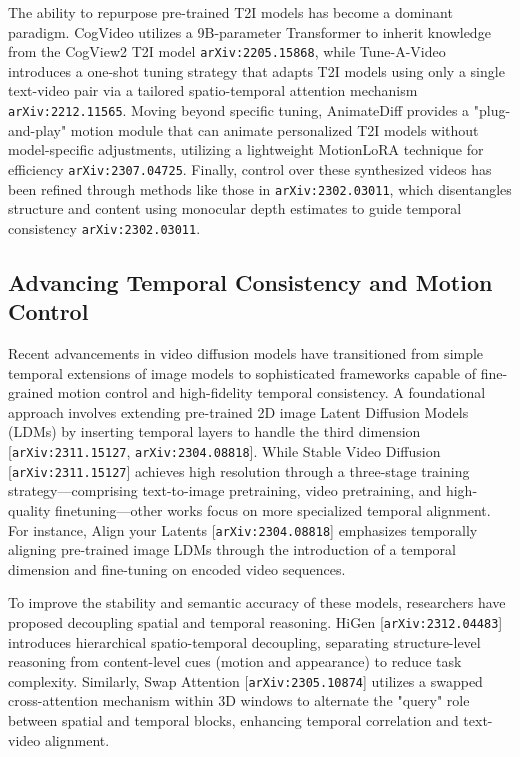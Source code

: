 \documentclass[11pt]{article}
\begin{document}
The ability to repurpose pre-trained T2I models has become a dominant paradigm. CogVideo utilizes a 9B-parameter Transformer to inherit knowledge from the CogView2 T2I model \texttt{arXiv:2205.15868}, while Tune-A-Video introduces a one-shot tuning strategy that adapts T2I models using only a single text-video pair via a tailored spatio-temporal attention mechanism \texttt{arXiv:2212.11565}. Moving beyond specific tuning, AnimateDiff provides a "plug-and-play" motion module that can animate personalized T2I models without model-specific adjustments, utilizing a lightweight MotionLoRA technique for efficiency \texttt{arXiv:2307.04725}. Finally, control over these synthesized videos has been refined through methods like those in \texttt{arXiv:2302.03011}, which disentangles structure and content using monocular depth estimates to guide temporal consistency \texttt{arXiv:2302.03011}.

\subsection{Advancing Temporal Consistency and Motion Control}

Recent advancements in video diffusion models have transitioned from simple temporal extensions of image models to sophisticated frameworks capable of fine-grained motion control and high-fidelity temporal consistency. A foundational approach involves extending pre-trained 2D image Latent Diffusion Models (LDMs) by inserting temporal layers to handle the third dimension [\texttt{arXiv:2311.15127}, \texttt{arXiv:2304.08818}]. While Stable Video Diffusion [\texttt{arXiv:2311.15127}] achieves high resolution through a three-stage training strategy—comprising text-to-image pretraining, video pretraining, and high-quality finetuning—other works focus on more specialized temporal alignment. For instance, Align your Latents [\texttt{arXiv:2304.08818}] emphasizes temporally aligning pre-trained image LDMs through the introduction of a temporal dimension and fine-tuning on encoded video sequences.

To improve the stability and semantic accuracy of these models, researchers have proposed decoupling spatial and temporal reasoning. HiGen [\texttt{arXiv:2312.04483}] introduces hierarchical spatio-temporal decoupling, separating structure-level reasoning from content-level cues (motion and appearance) to reduce task complexity. Similarly, Swap Attention [\texttt{arXiv:2305.10874}] utilizes a swapped cross-attention mechanism within 3D windows to alternate the "query" role between spatial and temporal blocks, enhancing temporal correlation and text-video alignment.
\end{document}
